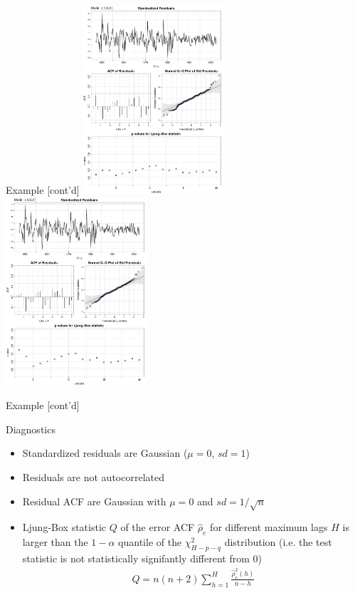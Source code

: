 \documentclass[ignorenonframetext,xcolor=x11names]{beamer}
\begin{document}
\begin{frame}{Example \small [cont'd]}
\centering
\includegraphics[height=2.75in]{figure24.pdf}
\includegraphics[height=2.75in]{figure25.pdf}
\end{frame}

\begin{frame}{Example \small [cont'd]}
\begin{block}{Diagnostics}
\begin{itemize}
   \item Standardized residuals are Gaussian ($\mu=0$, $sd=1$)
   \item Residuals are not autocorrelated
   \item Residual ACF are Gaussian with $\mu=0$ and $sd=1/\sqrt{n}$
   \item Ljung-Box statistic $Q$ of the error ACF $\hat\rho_e$ for different maximum lags $H$ is larger than the $1-\alpha$ quantile of the $\chi^2_{H-p-q}$ distribution (i.e. the test statistic is not statistically signifantly different from $0$)
   \begin{align*}
   Q = n(n+2) \sum_{h=1}^H \frac{\hat\rho_e^2(h)}{n-h}
   \end{align*}
\end{itemize}
\end{block}
\end{frame}
\end{document}
